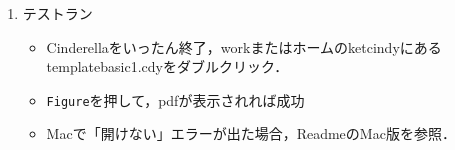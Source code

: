 \documentclass{ujarticle}
\begin{document}
\begin{enumerate}[\bf\large 1.]
\vspace{76mm}

\item テストラン\vspace{-2mm}

\begin{itemize}
 \item Cinderellaをいったん終了，workまたはホームのketcindyにあるtemplatebasic1.cdyをダブルクリック．
\item\verb|Figure|を押して，pdfが表示されれば成功
\item Macで「開けない」エラーが出た場合，ReadmeのMac版を参照．
\end{itemize}

\end{enumerate}
\end{document}
